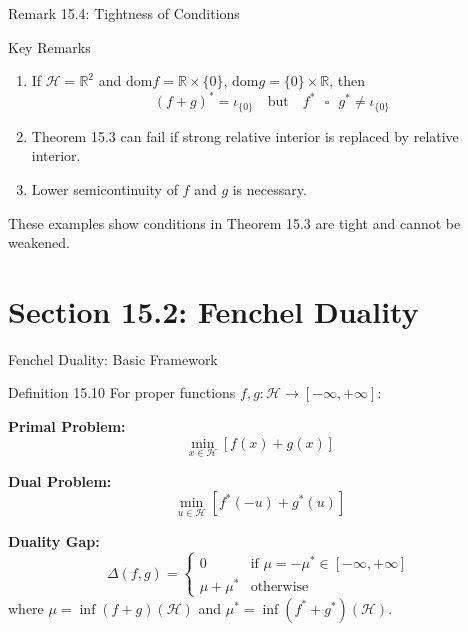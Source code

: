 \documentclass[aspectratio=169,10pt]{beamer}
\begin{document}
\begin{frame}{Remark 15.4: Tightness of Conditions}
  \begin{block}{Key Remarks}
    \begin{enumerate}
      \item If $\mathcal{H} = \mathbb{R}^2$ and $\text{dom} f = \mathbb{R} \times \{0\}$, $\text{dom} g = \{0\} \times \mathbb{R}$, then
        \[
          (f + g)^* = \iota_{\{0\}} \quad \text{but} \quad f^* \text{ } \square \text{ } g^* \neq \iota_{\{0\}}
        \]
      
      \item Theorem 15.3 can fail if strong relative interior is replaced by relative interior.
      
      \item Lower semicontinuity of $f$ and $g$ is necessary.
    \end{enumerate}
  \end{block}
  
  These examples show conditions in Theorem 15.3 are tight and cannot be weakened.
\end{frame}


\section[15.2]{Section 15.2: Fenchel Duality}

\begin{frame}{Fenchel Duality: Basic Framework}
  \begin{block}{Definition 15.10}
    For proper functions $f, g: \mathcal{H} \to [-\infty, +\infty]$:
    
    \textbf{Primal Problem:}
    \[
      \min_{x \in \mathcal{H}} [f(x) + g(x)]
    \]
    
    \textbf{Dual Problem:}
    \[
      \min_{u \in \mathcal{H}} [f^*(-u) + g^*(u)]
    \]
    
    \textbf{Duality Gap:}
    \[
      \Delta(f,g) = \begin{cases}
        0 & \text{if } \mu = -\mu^* \in [-\infty, +\infty] \\
        \mu + \mu^* & \text{otherwise}
      \end{cases}
    \]
    where $\mu = \inf(f+g)(\mathcal{H})$ and $\mu^* = \inf(f^* + g^*)(\mathcal{H})$.
  \end{block}
\end{frame}
\end{document}
